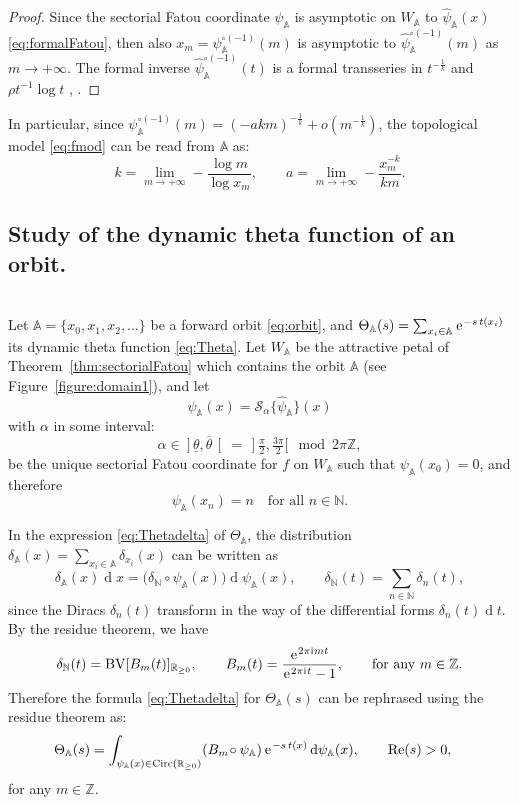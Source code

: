 \documentclass[a4paper,11pt]{amsart}
\numberwithin{equation}{section}
\newcommand{\N}{{\mathbb N}}
\newcommand{\Z}{{\mathbb Z}}
\newcommand{\R}{{\mathbb R}}
\newcommand{\re}{\operatorname{Re}}
\renewcommand{\i}{\mathrm{i}\mkern.25\thinmuskip}
\renewcommand{\d}{\ensuremath{\operatorname{d}\!}}
\newcommand{\e}{\ensuremath{\mkern.25\thinmuskip\mathrm{e}\mkern.4\thinmuskip}}
\newcommand{\orbit}{\mathbb{A}}
\newcommand{\BSum}{\mathscr{S}}
\newcommand{\BV}{\operatorname{BV}}
\newcommand{\Circ}{\operatorname{Circ}}
\theoremstyle{definition}
\begin{document}
\begin{proof}
Since the sectorial Fatou coordinate $\psi_\orbit$ is asymptotic on $W_\orbit$ to $\hat\psi_\orbit(x)$ \eqref{eq:formalFatou}, 
then also $x_m=\psi_\orbit^{\circ(-1)}(m)$ is asymptotic to $\hat\psi_\orbit^{\circ(-1)}(m)$ as $m\to+\infty$. 
The formal inverse $\hat\psi_\orbit^{\circ(-1)}(t)$ is a formal transseries in $t^{-\frac{1}{k}}$ and $\rho t^{-1}\log t$ \cite[Theorem 3.1]{Kimura}, \cite[eq. (5.1.6)]{Ecalle3}.
\end{proof}


In particular, since $\psi_\orbit^{\circ(-1)}(m)=(-akm)^{-\frac1k}+o(m^{-\frac1k})$, the topological model \eqref{eq:fmod} can be read from $\orbit$ as:
\[k=\lim_{m\to+\infty}-\frac{\log m}{\log{x_m}},\qquad a=\lim_{m\to+\infty}-\frac{x_m^{-k}}{km}.\] 



\subsection{Study of the dynamic theta function of an orbit.} ~\\
Let $\orbit=\{x_0,x_1,x_2,\ldots\}$ be a forward orbit \eqref{eq:orbit}, and 
$\Theta_\orbit(s)=\sum_{x_i\in\orbit}\e^{-s\,t(x_i)}$
its dynamic theta function \eqref{eq:Theta}.
Let $W_\orbit$ be the attractive petal of Theorem~\ref{thm:sectorialFatou} which contains the orbit $\orbit$ (see Figure~\ref{figure:domain1}), 
and let
\[\psi_\orbit(x)=\BSum_\alpha\{\hat\psi_\orbit\}(x)\] 
with $\alpha$ in some interval:
\begin{equation}\label{eq:thetaalpha}
	\alpha\in\ ]\,\underline{\theta},\overline{\theta}\,[\ = \ ]\tfrac{\pi}{2},\tfrac{3\pi}{2}[\mod 2\pi\Z,
\end{equation} 
be the unique sectorial Fatou coordinate for $f$ on $W_\orbit$ such that $\psi_\orbit(x_0)=0$, and therefore  
\[\psi_\orbit(x_n)=n\quad\text{for all $n\in\N$}.\]

In the expression \eqref{eq:Thetadelta} of $\Theta_\orbit$, the distribution
$\delta_\orbit(x)=\sum_{x_i\in\orbit}\delta_{x_i}(x)$ can be written as
\begin{equation*}\label{eq:Diracorbit}
    \delta_\orbit(x)\d x=\big(\delta_\N\circ\psi_\orbit(x)\big) \d \psi_\orbit(x),\qquad \delta_\N(t)=\sum_{n\in\N}\delta_n(t),
\end{equation*}
since the Diracs $\delta_n(t)$ transform in the way of the differential forms $\delta_n(t)\d t$.
By the residue theorem, we have
\begin{equation*}\label{eq:Bm}
	\delta_\N(t)=\BV[B_m(t)]_{\R_{\geq0}},\qquad  B_m(t)=\frac{\e^{2\pi\i  mt}}{\e^{2\pi\i  t}-1},
\qquad\text{for any $m\in\Z$.}
\end{equation*}
Therefore the formula \eqref{eq:Thetadelta} for $\Theta_\orbit(s)$ can be rephrased using the residue theorem as:
\begin{equation}\label{eq:ThetaB}
	\begin{aligned}
		\Theta_\orbit(s) &=\int_{\psi_\orbit(x)\in\Circ(\R_{\geq 0})}(B_m\!\circ\psi_\orbit)\,\e^{-s\,t(x)} \d\psi_\orbit(x),\qquad \re(s)>0,
	\end{aligned}
\end{equation}
for any $m\in\Z$.
\end{document}
